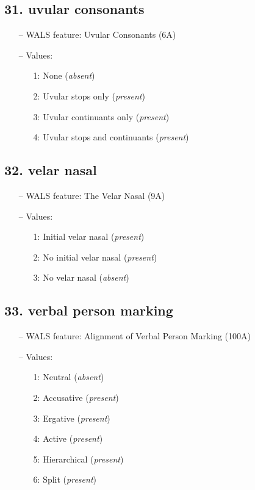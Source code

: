 \subsection*{31. uvular consonants}

\begin{itemize}
  \item[--] WALS feature: Uvular Consonants (6A)
  \item[--] Values:
  {\small
  \begin{enumerate}
    \item[1:] None (\emph{absent})
    \item[2:] Uvular stops only (\emph{present})
    \item[3:] Uvular continuants only (\emph{present})
    \item[4:] Uvular stops and continuants (\emph{present})
  \end{enumerate}
  }
\end{itemize}


\subsection*{32. velar nasal}

\begin{itemize}
  \item[--] WALS feature: The Velar Nasal (9A)
  \item[--] Values:
  {\small
  \begin{enumerate}
    \item[1:] Initial velar nasal (\emph{present})
    \item[2:] No initial velar nasal (\emph{present})
    \item[3:] No velar nasal (\emph{absent})
  \end{enumerate}
  }
\end{itemize}


\subsection*{33. verbal person marking}

\begin{itemize}
  \item[--] WALS feature: Alignment of Verbal Person Marking (100A)
  \item[--] Values:
  {\small
  \begin{enumerate}
    \item[1:] Neutral (\emph{absent})
    \item[2:] Accusative (\emph{present})
    \item[3:] Ergative (\emph{present})
    \item[4:] Active (\emph{present})
    \item[5:] Hierarchical (\emph{present})
    \item[6:] Split (\emph{present})
  \end{enumerate}
  }
\end{itemize}


